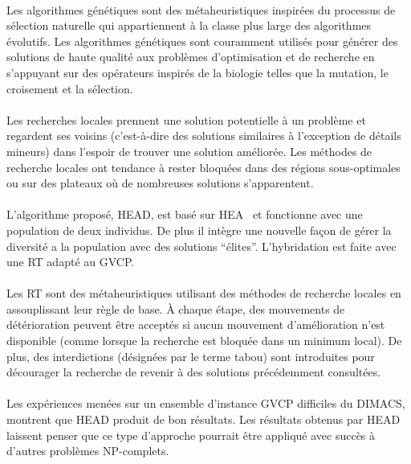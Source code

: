 \documentclass[a4paper,11pt,twoside,french,report]{../common/simplem}
\begin{document}
				\paragraph*{}
					Les algorithmes génétiques sont des métaheuristiques inspirées du processus de sélection naturelle qui appartiennent à la classe plus large des algorithmes évolutifs. Les algorithmes génétiques sont couramment utilisés pour générer des solutions de haute qualité aux problèmes d'optimisation et de recherche en s'appuyant sur des opérateurs inspirés de la biologie telles que la mutation, le croisement et la sélection.
				\paragraph*{}
					Les recherches locales prennent une solution potentielle à un problème et regardent ses voisins (c'est-à-dire des solutions similaires à l'exception de détails mineurs) dans l'espoir de trouver une solution améliorée. Les méthodes de recherche locales ont tendance à rester bloquées dans des régions sous-optimales ou sur des plateaux où de nombreuses solutions s’apparentent.
				\paragraph*{}
					L'algorithme proposé, \gls{HEAD}, est basé sur \gls{HEA}~\cite{Galinier1999} et fonctionne avec une population de deux individus. De plus il intègre une nouvelle façon de gérer la diversité a la population avec des solutions ``élites''. L'hybridation est faite avec une \gls{RT} adapté au \gls{GVCP}.
				\paragraph*{}
					Les \gls{RT} sont des métaheuristiques utilisant des méthodes de recherche locales en assouplissant leur règle de base. À chaque étape, des mouvements de détérioration peuvent être acceptés si aucun mouvement d'amélioration n'est disponible (comme lorsque la recherche est bloquée dans un minimum local). De plus, des interdictions (désignées par le terme tabou) sont introduites pour décourager la recherche de revenir à des solutions précédemment consultées.
				\paragraph*{}
					Les expériences menées sur un ensemble d'instance \gls{GVCP} difficiles du \gls{DIMACS}, montrent que \gls{HEAD} produit de bon résultats. Les résultats obtenus par \gls{HEAD} laissent penser que ce type d'approche pourrait être appliqué avec succès à d'autres problèmes \acrshort{NP}-complets.
\end{document}
